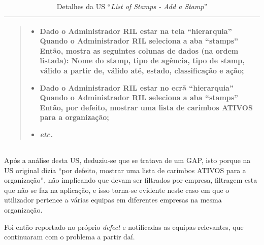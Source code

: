 \begin{table}[H]
\begin{tabularx}{1\textwidth}{|>{\raggedright\arraybackslash}X|}
\begin{quote}
\begin{itemize}
                                \item Dado o Administrador RIL estar na tela ``hierarquia'' \newline
                                Quando o Administrador RIL seleciona a aba ``stamps'' \newline
                                Então, mostra as seguintes colunas de dados (na ordem listada): Nome do stamp, tipo de agência, tipo de stamp, válido a partir de, válido até, estado, classificação e ação;

                                \item Dado o Administrador RIL estar no ecrã ``hierarquia'' \newline
                                Quando o Administrador RIL seleciona a aba ``stamps'' \newline
                                Então, por defeito, mostrar uma lista de carimbos ATIVOS para a organização;
                            
                                \item \textit{etc.}
                            \end{itemize}
                            
                        \end{quote}
                        \\
                        \hline
                    \end{tabularx}
                    \caption{Detalhes da US ``\textit{List of Stamps - Add a Stamp}''}\label{table:us1}
                \end{table}

                Após a análise desta US, deduziu-se que se tratava de um GAP, isto porque na US original dizia ``por defeito, mostrar uma lista de carimbos ATIVOS para a organização'', não implicando que devam ser filtrados por empresa, filtragem esta que não se faz na aplicação, e isso torna-se evidente neste caso em que o utilizador pertence a várias equipas em diferentes empresas na mesma organização.

                Foi então reportado no próprio \textit{defect} e notificadas as equipas relevantes, que continuaram com o problema a partir daí.


